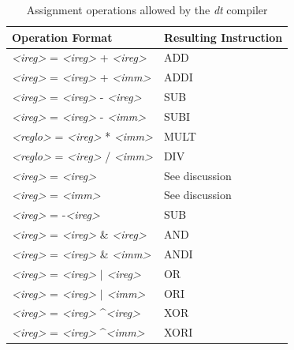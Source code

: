 \begin{table}
\centering
\caption{Assignment operations allowed by the \emph{dt} compiler}
\begin{tabular}{|l|l|}
\hline
\textbf{Operation Format} & \textbf{Resulting Instruction} \\ \hline \hline
\emph{\textless ireg\textgreater} = \emph{\textless ireg\textgreater} + \emph{\textless ireg\textgreater} & ADD \\ \hline
\emph{\textless ireg\textgreater} = \emph{\textless ireg\textgreater} + \emph{\textless imm\textgreater} & ADDI \\ \hline
\emph{\textless ireg\textgreater} = \emph{\textless ireg\textgreater} - \emph{\textless ireg\textgreater} & SUB \\ \hline
\emph{\textless ireg\textgreater} = \emph{\textless ireg\textgreater} - \emph{\textless imm\textgreater} & SUBI \\ \hline
\emph{\textless reglo\textgreater} = \emph{\textless ireg\textgreater} * \emph{\textless imm\textgreater} & MULT \\ \hline
\emph{\textless reglo\textgreater} = \emph{\textless ireg\textgreater} / \emph{\textless imm\textgreater} & DIV \\ \hline
\emph{\textless ireg\textgreater} = \emph{\textless ireg\textgreater} & See discussion \\ \hline
\emph{\textless ireg\textgreater} = \emph{\textless imm\textgreater} & See discussion \\ \hline
\emph{\textless ireg\textgreater} = -\emph{\textless ireg\textgreater} & SUB \\ \hline
\emph{\textless ireg\textgreater} = \emph{\textless ireg\textgreater} \& \emph{\textless ireg\textgreater} & AND \\ \hline
\emph{\textless ireg\textgreater} = \emph{\textless ireg\textgreater} \& \emph{\textless imm\textgreater} & ANDI \\ \hline
\emph{\textless ireg\textgreater} = \emph{\textless ireg\textgreater} $\vert$ \emph{\textless ireg\textgreater} & OR \\ \hline
\emph{\textless ireg\textgreater} = \emph{\textless ireg\textgreater} $\vert$ \emph{\textless imm\textgreater} & ORI \\ \hline
\emph{\textless ireg\textgreater} = \emph{\textless ireg\textgreater} \textasciicircum \emph{\textless ireg\textgreater} & XOR \\ \hline
\emph{\textless ireg\textgreater} = \emph{\textless ireg\textgreater} \textasciicircum \emph{\textless imm\textgreater} & XORI \\ \hline

\end{tabular}
\end{table}
